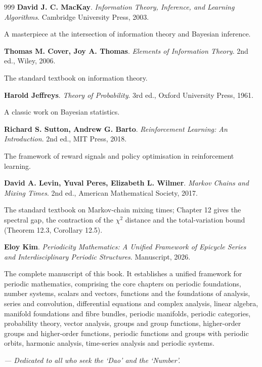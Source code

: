 \begin{thebibliography}{999}
 \textbf{David J. C. MacKay}. \textit{Information Theory, Inference, and Learning Algorithms}. Cambridge University Press, 2003.

A masterpiece at the intersection of information theory and Bayesian inference.

 \textbf{Thomas M. Cover, Joy A. Thomas}. \textit{Elements of Information Theory}. 2nd ed., Wiley, 2006.

The standard textbook on information theory.

 \textbf{Harold Jeffreys}. \textit{Theory of Probability}. 3rd ed., Oxford University Press, 1961.

A classic work on Bayesian statistics.

 \textbf{Richard S. Sutton, Andrew G. Barto}. \textit{Reinforcement Learning: An Introduction}. 2nd ed., MIT Press, 2018.

The framework of reward signals and policy optimisation in reinforcement learning.

 \textbf{David A. Levin, Yuval Peres, Elizabeth L. Wilmer}. \textit{Markov Chains and Mixing Times}. 2nd ed., American Mathematical Society, 2017.

The standard textbook on Markov-chain mixing times; Chapter 12 gives the spectral gap, the contraction of the $\chi^2$ distance and the total-variation bound (Theorem 12.3, Corollary 12.5).

 \textbf{Eloy Kim}. \textit{Periodicity Mathematics: A Unified Framework of Epicycle Series and Interdisciplinary Periodic Structures}. Manuscript, 2026.

The complete manuscript of this book. It establishes a unified framework for periodic mathematics, comprising the core chapters on periodic foundations, number systems, scalars and vectors, functions and the foundations of analysis, series and convolution, differential equations and complex analysis, linear algebra, manifold foundations and fibre bundles, periodic manifolds, periodic categories, probability theory, vector analysis, groups and group functions, higher-order groups and higher-order functions, periodic functions and groups with periodic orbits, harmonic analysis, time-series analysis and periodic systems.

\end{thebibliography}

\endgroup


\vspace{1cm}
\begin{flushright}
\textit{--- Dedicated to all who seek the `Dao' and the `Number'.}
\end{flushright}


